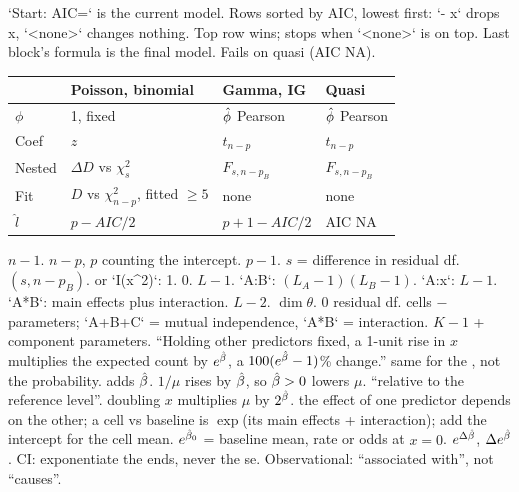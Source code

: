 \sk{} `Start: AIC=` is the current model. Rows sorted by AIC, lowest first: `- x` drops x, `<none>` changes nothing. Top row wins; stops when `<none>` is on top. Last block's formula is the final model. Fails on quasi (AIC NA).
\bx
{}\par
{\renewcommand{\arraystretch}{1.08}%
\begin{tabular}{@{}|p{}|p{}|p{}|p{}|@{}}\hline
\rowcolor{hdr}&Poisson, binomial&Gamma, IG&Quasi\\\hline
$\phi$&1, fixed&$\hat{\phi}$ Pearson&$\hat{\phi}$ Pearson\\\hline
Coef&$z$&$t_{n-p}$&$t_{n-p}$\\\hline
Nested&$\Delta D$ vs $\chi^2_s$&$F_{s,n-p_B}$&$F_{s,n-p_B}$\\\hline
Fit&$D$ vs $\chi^2_{n-p}$, fitted $\ge5$&none&none\\\hline
$\hat l$&$p-AIC/2$&$p{+}1-AIC/2$&AIC NA\\\hline
\end{tabular}}
\bx
{}  $n-1$.  $n-p$, $p$ counting the intercept.  $p-1$.  $s$ = difference in residual df.  $(s,n-p_B)$.  or `I(x^2)`: 1.  0.  $L-1$.  `A:B`: $(L_A-1)(L_B-1)$.  `A:x`: $L-1$. `A*B`: main effects plus interaction.  $L-2$.  $\dim\theta$.  0 residual df.  cells $-$ parameters; `A+B+C` = mutual independence, `A*B` = interaction.  $K-1$ + component parameters.
\bx
{}  “Holding other predictors fixed, a 1-unit rise in $x$ multiplies the expected count by $e^{\hat{\beta}}$, a $100(e^{\hat{\beta}}-1)$\% change.”  same for the , not the probability.  adds $\hat{\beta}$.  $1/\mu$ rises by $\hat{\beta}$, so $\hat{\beta}>0$ lowers $\mu$.  “relative to the reference level”.  doubling $x$ multiplies $\mu$ by $2^{\hat{\beta}}$.  the effect of one predictor depends on the other; a cell vs baseline is $\exp$(its main effects + interaction); add the intercept for the cell mean.  $e^{\hat{\beta}_0}$ = baseline mean, rate or odds at $x=0$.  $e^{\Delta\hat{\beta}}$,  $\Delta e^{\hat{\beta}}$. CI: exponentiate the ends, never the se. Observational: “associated with”, not “causes”.
